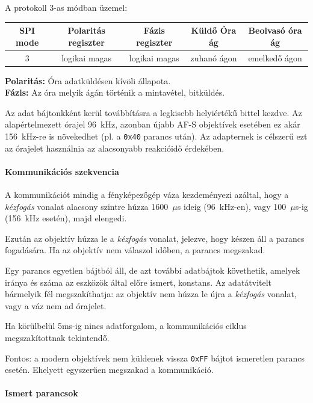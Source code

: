 A protokoll 3-as módban üzemel:
\begin{table}[H]
    \centering
    \begin{tabular}{|c|c|c|c|c|}
        \hline
        \rowcolor{lightgray} SPI mode & Polaritás regiszter & Fázis regiszter & Küldő Óra ág & Beolvasó óra ág \\
        \hline
        3 & logikai magas & logikai magas & zuhanó ágon & emelkedő ágon \\
        \hline
    \end{tabular}
\end{table} \textbf{Polaritás:} Óra adatküldésen kívöli állapota.\\
\textbf{Fázis:} Az óra melyik ágán történik a mintavétel, bitküldés.

Az adat bájtonkként kerül továbbításra a legkisebb helyiértékű bittel kezdve.
Az alapértelmezett órajel 96~kHz, azonban újabb AF-S objektívek esetében ez akár 156~kHz-re is növekedhet (pl. a \texttt{0x40} parancs után).
Az adapternek is célszerű ezt az órajelet használnia az alacsonyabb reakcióidő érdekében.

\paragraph{Kommunikációs szekvencia}

A kommunikációt mindig a fényképezőgép váza kezdeményezi azáltal, hogy 
a \textit{kézfogás} vonalat alacsony szintre húzza 1600~$\mu$s ideig 
(96~kHz-en), vagy 100~$\mu$s-ig (156~kHz esetén), majd elengedi. 

Ezután az objektív húzza le a \textit{kézfogás} vonalat, jelezve, hogy készen 
áll a parancs fogadására. Ha az objektív nem válaszol időben, a parancs 
megszakad.

Egy parancs egyetlen bájtból áll, de azt további adatbájtok követhetik, 
amelyek iránya és száma az eszközök által előre ismert, konstans.
Az adatátvitelt bármelyik fél megszakíthatja: az objektív nem húzza le újra a \textit{kézfogás} vonalat, vagy a váz nem ad órajelet. 

Ha körülbelül 5ms-ig nincs adatforgalom, a kommunikációs ciklus megszakítottnak tekintendő.

Fontos: a modern objektívek nem küldenek vissza \texttt{0xFF} bájtot 
ismeretlen parancs esetén. Ehelyett egyszerűen megszakad a kommunikáció.

\paragraph{Ismert parancsok}

